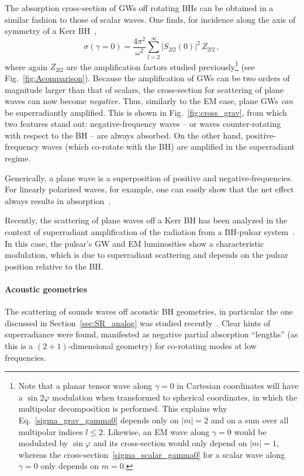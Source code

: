 \documentclass[11pt]{article}
\newcommand{\be}{\begin{equation}}
\newcommand{\ee}{\end{equation}}
\numberwithin{equation}{section} %
\begin{document}
The absorption cross-section of GWs off rotating BHs can be obtained in a similar fashion to those of scalar waves.
One finds, for incidence along the axis of symmetry of a Kerr BH~\cite{Chrzanowski:1976jb,Matzner:1977dn,1978ApJS...36..451M,1988sfbh.book.....F,Dolan:2008kf},
%
\be
\sigma(\gamma=0)=\frac{4\pi^2}{\omega^2}\sum_{l=2}^{\infty}\left|S_{2l2}(0)\right|^2\,Z_{2l2}\,,
\label{sigma_grav_gamma0}
\ee
%
where again $Z_{2l2}$ are the amplification factors studied previously\footnote{Note that a planar tensor wave along $\gamma=0$ in Cartesian coordinates will have a $\sin2\varphi$ modulation when transformed to spherical coordinates, in which the multipolar decomposition is performed. This explains why Eq.~\eqref{sigma_grav_gamma0} depends only on $|m|=2$ and on a sum over all multipolar indices $l\leq2$. Likewise, an EM wave along $\gamma=0$ would be modulated by $\sin\varphi$ and its cross-section would only depend on $|m|=1$, whereas the cross-section~\eqref{sigma_scalar_gamma0} for a scalar wave along $\gamma=0$ only depends on $m=0$.} (see Fig.~\ref{fig:Acomparison}). 
Because the amplification of GWs can be two orders of magnitude larger than that of scalars,
the cross-section for scattering of plane waves can now become {\it negative}. Thus, similarly to the EM 
case, plane GWs {\it can} be superradiantly
amplified. This is shown in Fig.~\ref{fig:cross_grav}, from which two features stand out: negative-frequency waves -- or waves counter-rotating with respect to the BH -- are always absorbed. On the other hand, positive-frequency waves (which co-rotate with the BH) are amplified in the superradiant regime.

Generically, a plane wave is a superposition of positive and negative-frequencies. For linearly polarized waves, for example,
one can easily show that the net effect always results in absorption~\cite{Dolan:2008kf}.

Recently, the scattering of plane waves off a Kerr BH has been analyzed in the context of superradiant amplification of 
the radiation from a BH-pulsar system~\cite{Rosa:2015hoa}. In this case, the pulsar's GW and EM luminosities show a 
characteristic modulation, which is due to superradiant scattering and depends on the pulsar position relative to the 
BH.


\paragraph{Acoustic geometries}
The scattering of sounds waves off acoustic BH geometries, in particular the one discussed in Section~\ref{sec:SR_analog}
was studied recently~\cite{Oliveira:2010zzb,Hod:2017lho}. Clear hints of superradiance were found, manifested as negative partial absorption ``lengths''
(as this is a $(2+1)$-dimensional geometry) for co-rotating modes at low frequencies.
\end{document}
